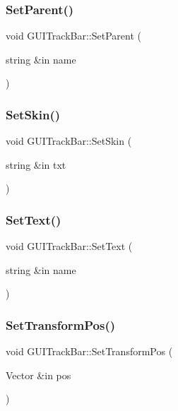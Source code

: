 \subsubsection{\texorpdfstring{Set\+Parent()}{SetParent()}}
{\footnotesize\ttfamily void G\+U\+I\+Track\+Bar\+::\+Set\+Parent (\begin{DoxyParamCaption}\item[{string \&in}]{name }\end{DoxyParamCaption})}

\hypertarget{class_g_u_i_track_bar_a3d444544651c46a869d527f2474dd721}{}\label{class_g_u_i_track_bar_a3d444544651c46a869d527f2474dd721} 
\subsubsection{\texorpdfstring{Set\+Skin()}{SetSkin()}}
{\footnotesize\ttfamily void G\+U\+I\+Track\+Bar\+::\+Set\+Skin (\begin{DoxyParamCaption}\item[{string \&in}]{txt }\end{DoxyParamCaption})}

\hypertarget{class_g_u_i_track_bar_adf110174e2e2d22be42b5cff2f3c4045}{}\label{class_g_u_i_track_bar_adf110174e2e2d22be42b5cff2f3c4045} 
\subsubsection{\texorpdfstring{Set\+Text()}{SetText()}}
{\footnotesize\ttfamily void G\+U\+I\+Track\+Bar\+::\+Set\+Text (\begin{DoxyParamCaption}\item[{string \&in}]{name }\end{DoxyParamCaption})}

\hypertarget{class_g_u_i_track_bar_aefb9e73a2fef399318cf019a58aa27f2}{}\label{class_g_u_i_track_bar_aefb9e73a2fef399318cf019a58aa27f2} 
\subsubsection{\texorpdfstring{Set\+Transform\+Pos()}{SetTransformPos()}}
{\footnotesize\ttfamily void G\+U\+I\+Track\+Bar\+::\+Set\+Transform\+Pos (\begin{DoxyParamCaption}\item[{Vector \&in}]{pos }\end{DoxyParamCaption})}

